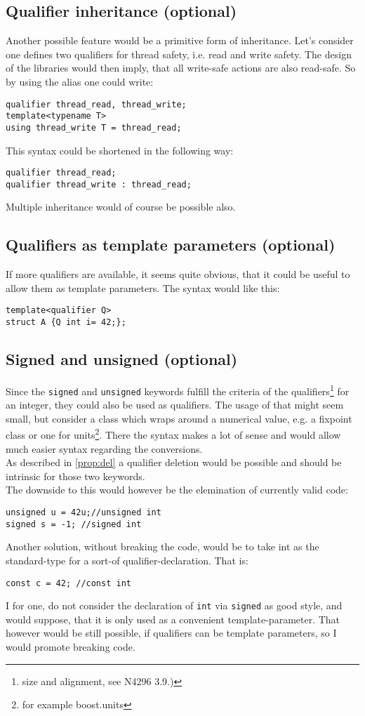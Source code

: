 \subsection{Qualifier inheritance (optional)}
Another possible feature would be a primitive form of inheritance. Let's consider one defines two qualifiers for thread safety, i.e. read and write safety. The design of the libraries would then imply, that all write-safe actions are also read-safe. So by using the alias one could write:
\begin{lstlisting}
qualifier thread_read, thread_write;
template<typename T>
using thread_write T = thread_read;
\end{lstlisting}
This syntax could be shortened in the following way:
\begin{lstlisting}
qualifier thread_read;
qualifier thread_write : thread_read;
\end{lstlisting} 
Multiple inheritance would of course be possible also.
\subsection{Qualifiers as template parameters (optional)}
If more qualifiers are available, it seems quite obvious, that it could be useful to allow them as template parameters. The syntax would like this:
\begin{lstlisting}
template<qualifier Q>
struct A {Q int i= 42;};
\end{lstlisting}
\subsection{Signed and unsigned (optional)} \label{prop:sign}
Since the \lstinline{signed} and \lstinline{unsigned} keywords fulfill the criteria of the qualifiers\footnote{size and alignment, see N4296 3.9.)} for an integer, they could also be used as qualifiers. The usage of that might seem small, but consider a class which wraps around a numerical value, e.g. a fixpoint class or one for units\footnote{for example boost.units}. There the syntax makes a lot of sense and would allow much easier syntax regarding the conversions.\\
As described in \ref{prop:del} a qualifier deletion would be possible and should be intrinsic for those two keywords.\\
The downside to this would however be the elemination of currently valid code:
\begin{lstlisting}
unsigned u = 42u;//unsigned int
signed s = -1; //signed int
\end{lstlisting}
Another solution, without breaking the code, would be to take int as the standard-type for a sort-of qualifier-declaration. That is:
\begin{lstlisting}
const c = 42; //const int
\end{lstlisting}
I for one, do not consider the declaration of \lstinline {int} via \lstinline {signed} as good style, and would suppose, that it is only used as a convenient template-parameter. That however would be still possible, if qualifiers can be template parameters, so I would promote breaking code.
